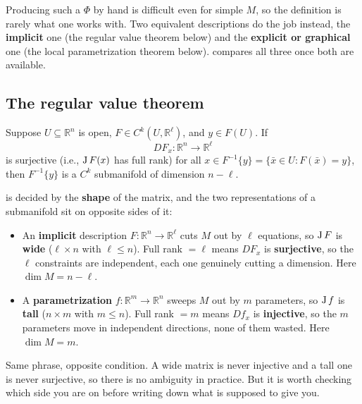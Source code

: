 \begin{remark}
Producing such a $\Phi$ by hand is difficult even for simple $M$, so the definition is rarely
what one works with. Two equivalent descriptions do the job instead, the \textbf{implicit} one
(the regular value theorem below) and the \textbf{explicit or graphical} one (the local
parametrization theorem below).  compares all three
once both are available.
\end{remark}

\subsection{The regular value theorem}

\begin{theorem}
\label{thm:regular_value_theorem}
Suppose $U \subseteq \mathbb{R}^n$ is open, $F \in C^k(U,\mathbb{R}^\ell)$, and $y \in F(U)$. If
\[DF_x : \mathbb{R}^n \to \mathbb{R}^\ell\]
is surjective (i.e., $\operatorname{J} F(x)$ has full rank) for all $x \in F^{-1}\{y\} = \{\bar x \in U :
F(\bar x) = y\}$, then $F^{-1}\{y\}$ is a $C^k$ submanifold of dimension $n-\ell$.
\end{theorem}

\begin{importantremark}
\label{rem:full_rank_two_meanings}
 is decided by the \textbf{shape} of the matrix, and the two representations of a
submanifold sit on opposite sides of it:
\begin{itemize}
  \item An \textbf{implicit} description $F : \mathbb{R}^n \to \mathbb{R}^\ell$ cuts $M$ out by
    $\ell$ equations, so $\operatorname{J} F$ is \textbf{wide} ($\ell \times n$ with $\ell \leq n$). Full
    rank $=\ell$ means $DF_x$ is \textbf{surjective}, so the $\ell$ constraints are independent,
    each one genuinely cutting a dimension. Here $\dim M = n - \ell$.
  \item A \textbf{parametrization} $f : \mathbb{R}^m \to \mathbb{R}^n$ sweeps $M$ out by $m$
    parameters, so $\operatorname{J} f$ is \textbf{tall} ($n \times m$ with $m \leq n$). Full rank $=m$
    means $Df_x$ is \textbf{injective}, so the $m$ parameters move in independent directions,
    none of them wasted. Here $\dim M = m$.
\end{itemize}
Same phrase, opposite condition. A wide matrix is never injective and a tall one is never
surjective, so there is no ambiguity in practice. But it is worth checking which side you are on
before writing down what  is supposed to give you.
\end{importantremark}

